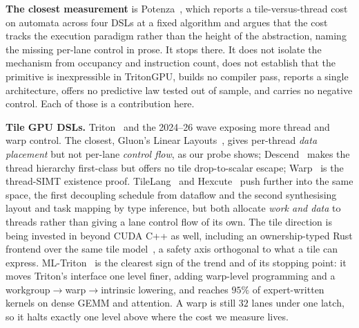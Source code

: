 \documentclass[sigplan,anonymous,review,nonacm,10pt]{acmart}
\begin{document}
\textbf{The closest measurement} is Potenza~\cite{twofaces2026}, which reports a
tile-versus-thread cost on automata across four DSLs at a fixed algorithm and argues that
the cost tracks the execution paradigm rather than the height of the abstraction, naming
the missing per-lane control in prose. It stops there. It does not isolate the mechanism
from occupancy and instruction count, does not establish that the primitive is
inexpressible in TritonGPU, builds no compiler pass, reports a single architecture, offers
no predictive law tested out of sample, and carries no negative control. Each of those is a
contribution here.

\textbf{Tile GPU DSLs.} Triton~\cite{triton2019} and the 2024--26 wave exposing more
thread and warp control. The closest, Gluon's Linear Layouts~\cite{linearlayouts2025},
gives per-thread \emph{data placement} but not per-lane \emph{control flow}, as our probe
shows; Descend~\cite{descend2024} makes the thread hierarchy first-class but offers no tile
drop-to-scalar escape; Warp~\cite{warp2022} is the thread-SIMT existence proof. TileLang~\cite{tilelang2025} and Hexcute~\cite{hexcute2025} push further into the same
space, the first decoupling schedule from dataflow and the second synthesising layout and
task mapping by type inference, but both allocate \emph{work and data} to threads rather
than giving a lane control flow of its own. The tile direction is being invested in beyond
CUDA C++ as well, including an ownership-typed Rust frontend over the same tile
model~\cite{fearless2026}, a safety axis orthogonal to what a tile can express.
ML-Triton~\cite{mltriton2025} is the clearest sign of the trend and of its stopping point:
it moves Triton's interface one level finer, adding warp-level programming and a
workgroup$\rightarrow$warp$\rightarrow$intrinsic lowering, and reaches $95\%$ of
expert-written kernels on dense GEMM and attention. A warp is still $32$ lanes under one
latch, so it halts exactly one level above where the cost we measure lives.
\end{document}
